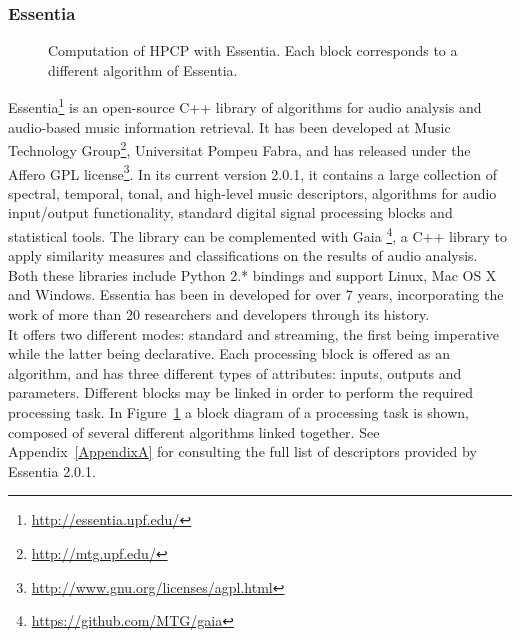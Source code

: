 \subsubsection*{Essentia}
\label{subsubsec:essentia}
\begin{figure}[b]\hskip -1cm
\caption[Computation of HPCP with Essentia]{Computation of HPCP with Essentia. Each block corresponds to a different algorithm of Essentia.}
\label{fig:hpcpessentia}
\end{figure}
Essentia\footnote{\url{http://essentia.upf.edu/}} is an open-source C++ library of algorithms for audio analysis and audio-based music information retrieval. It has been developed at Music Technology Group\footnote{\url{http://mtg.upf.edu/}}, Universitat Pompeu Fabra, and has released under the Affero GPL license\footnote{\url{http://www.gnu.org/licenses/agpl.html}}. In its current version 2.0.1, it contains a large collection of spectral, temporal, tonal, and high-level music descriptors, algorithms for audio input/output functionality, standard digital signal processing blocks and statistical tools. The library can be complemented with Gaia \footnote{\url{https://github.com/MTG/gaia}}, a C++ library to apply similarity measures and classifications on the results of audio analysis. Both these libraries include Python 2.* bindings and support Linux, Mac OS X and Windows. Essentia has been in developed for over 7 years, incorporating the work of more than 20 researchers and developers through its history. \\
It offers two different modes: standard and streaming, the first being imperative while the latter being declarative. Each processing block is offered as an algorithm, and has three different types of attributes: inputs, outputs and parameters. Different blocks may be linked in order to perform the required processing task. In Figure~\ref{fig:hpcpessentia} a block diagram of a processing task is shown, composed of several different algorithms linked together. See Appendix~\ref{AppendixA} for consulting the full list of descriptors provided by Essentia 2.0.1.



